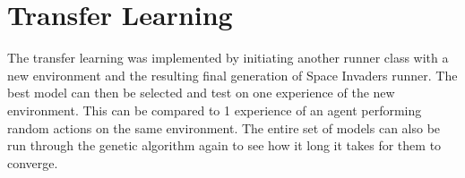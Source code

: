 \section{Transfer Learning}

The transfer learning was implemented by initiating another runner class with a new environment and the resulting final generation of Space Invaders runner. The best model can then be selected and test on one experience of the new environment. This can be compared to 1 experience of an agent performing random actions on the same environment. The entire set of models can also be run through the genetic algorithm again to see how it long it takes for them to converge.
